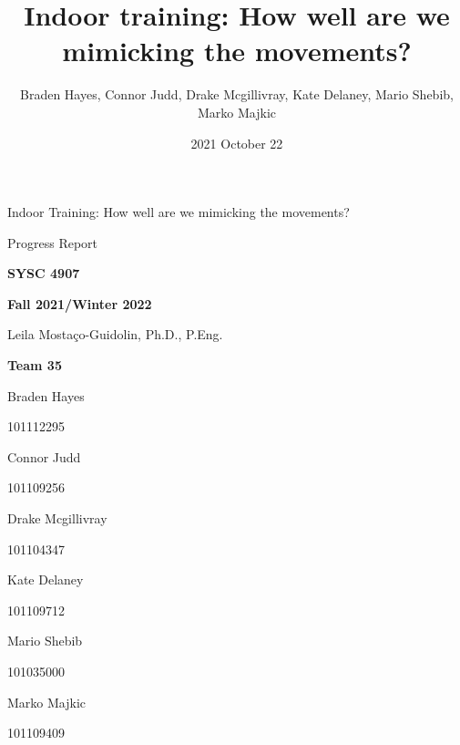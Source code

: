 \documentclass[11pt,letterpaper]{article}
\title{Indoor training: \newline How well are we mimicking the movements? }
\author{Braden Hayes, Connor Judd, Drake Mcgillivray, Kate Delaney, Mario Shebib, Marko Majkic}
\date{2021 October 22}
\begin{document}
\frenchspacing

\begin{titlepage}
\centering

{\Huge \sffamily Indoor Training: \newline How well are we mimicking the movements?}


{\Huge \sffamily Progress Report}

{\large \textbf{SYSC 4907}}

{\large \textbf{Fall 2021/Winter 2022}}

Leila Mostaço-Guidolin, Ph.D., P.Eng.


{\large \textbf{Team 35}}

Braden Hayes

{\footnotesize 101112295}

Connor Judd

{\footnotesize 101109256}

Drake Mcgillivray

{\footnotesize 101104347}

Kate Delaney

{\footnotesize 101109712}

Mario Shebib

{\footnotesize 101035000}

Marko Majkic

{\footnotesize 101109409}


\end{titlepage}
\tableofcontents

\end{document}
